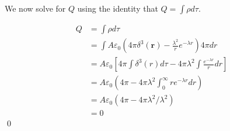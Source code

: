 \documentclass{homework}
\newcommand\ve{\varepsilon}
\newcommand{\bs}[1]{\ensuremath{\boldsymbol{#1}}}
\begin{document}
\begin{homeworkProblem}[Problem 2.50]
{    We now solve for $Q$ using the identity that $Q = \int \rho d \tau$.

    \begin{align*}
      Q &= \int \rho d \tau \\
        &= \int A \ve_0  \left(4 \pi \delta^3 (\bs{r}) - \frac{\lambda^2}{r} e^{-\lambda r} \right) 4 \pi dr \\
        &= A \ve_0 \left[ 4 \pi \int\delta^3(r) d \tau - 4 \pi \lambda^2 \int \frac{e^{-\lambda r}}{r} dr \right] \\
        & = A \ve_0 \left(4 \pi  - 4 \pi \lambda^2 \int_0^{\infty} r e ^{-\lambda r} dr \right) \\
        &= A \ve_0 \left(4 \pi  -  4 \pi\lambda^2 / \lambda^2 \right) \\
        &= 0
    \end{align*}
    \qed
  }
\end{homeworkProblem}
\end{document}

